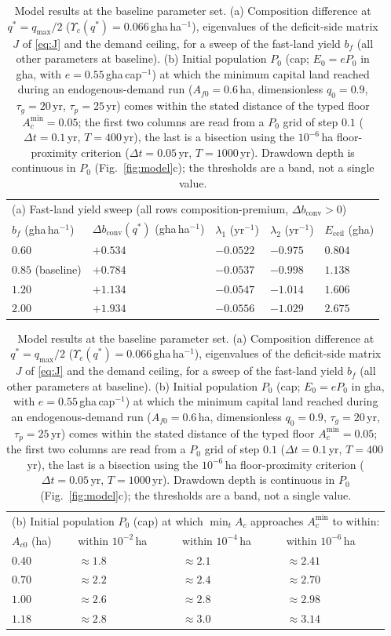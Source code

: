 \documentclass[preprint,12pt,authoryear]{elsarticle}
\newcommand{\dconv}{\Delta b_{\mathrm{conv}}}
\newcommand{\Ups}{\Upsilon_c}
\newcommand{\Eceil}{E_{\mathrm{ceil}}}
\newcommand{\Acmin}{A_c^{\min}}
\begin{document}
\begin{table}[!htbp]
\centering\small
\caption{Model results at the baseline parameter set. (a) Composition difference at $q^*=q_{\max}/2$ ($\Ups(q^*)=0.066$\,gha\,ha$^{-1}$), eigenvalues of the deficit-side matrix $J$ of \eqref{eq:J} and the demand ceiling, for a sweep of the fast-land yield $b_f$ (all other parameters at baseline). (b) Initial population $P_0$ (cap; $E_0=eP_0$ in gha, with $e=0.55$\,gha\,cap$^{-1}$) at which the minimum capital land reached during an endogenous-demand run ($A_{f0}=0.6$\,ha, dimensionless $q_0=0.9$, $\tau_g=20$\,yr, $\tau_p=25$\,yr) comes within the stated distance of the typed floor $\Acmin=0.05$; the first two columns are read from a $P_0$ grid of step $0.1$ ($\Delta t=0.1$\,yr, $T=400$\,yr), the last is a bisection using the $10^{-6}$\,ha floor-proximity criterion ($\Delta t=0.05$\,yr, $T=1000$\,yr). Drawdown depth is continuous in $P_0$ (Fig.~\ref{fig:model}c); the thresholds are a band, not a single value.}
\label{tab:model}
\begin{tabular}{l l l l l}
\toprule
\multicolumn{5}{l}{(a) Fast-land yield sweep (all rows composition-premium, $\dconv>0$)}\\
$b_f$ (gha\,ha$^{-1}$) & $\dconv(q^*)$ (gha\,ha$^{-1}$) & $\lambda_1$ (yr$^{-1}$) & $\lambda_2$ (yr$^{-1}$) & $\Eceil$ (gha) \\
\midrule
$0.60$ & $+0.534$ & $-0.0522$ & $-0.975$ & $0.804$ \\
$0.85$ (baseline) & $+0.784$ & $-0.0537$ & $-0.998$ & $1.138$ \\
$1.20$ & $+1.134$ & $-0.0547$ & $-1.014$ & $1.606$ \\
$2.00$ & $+1.934$ & $-0.0556$ & $-1.029$ & $2.675$ \\
\bottomrule
\end{tabular}

\medskip
\begin{tabular}{l l l l}
\toprule
\multicolumn{4}{l}{(b) Initial population $P_0$ (cap) at which $\min_tA_c$ approaches $\Acmin$ to within:}\\ 
$A_{c0}$ (ha) & within $10^{-2}$\,ha & within $10^{-4}$\,ha & within $10^{-6}$\,ha \\
\midrule
$0.40$ & $\approx1.8$ & $\approx2.1$ & $\approx2.41$ \\
$0.70$ & $\approx2.2$ & $\approx2.4$ & $\approx2.70$ \\
$1.00$ & $\approx2.6$ & $\approx2.8$ & $\approx2.98$ \\
$1.18$ & $\approx2.8$ & $\approx3.0$ & $\approx3.14$ \\
\bottomrule
\end{tabular}
\end{table}
\end{document}
